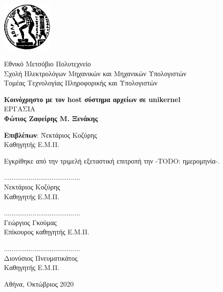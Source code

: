 \documentclass[12pt, a4paper, notitlepage]{report}
\newcommand{\en}[1]{\foreignlanguage{english}{#1}}
\newcommand{\blankpage}{\newpage\null\thispagestyle{empty}\newpage}
\newcommand{\host}{\en{host}}
\begin{document}
\blankpage

\vspace*{-8ex}
\noindent
\begin{minipage}{3.0cm}
	\includegraphics[height=2.5cm]{pyrforos}
\end{minipage}
\begin{minipage}{12.0cm}
	Εθνικό Μετσόβιο Πολυτεχνείο \\[3pt]
	Σχολή Ηλεκτρολόγων Μηχανικών και Μηχανικών Υπολογιστών \\[3pt]
	Τομέας Τεχνολογίας Πληροφορικής και Υπολογιστών
\end{minipage}
\vspace{14ex}
\begin{center}
	\large\textbf{Κοινόχρηστο με τον \host{} σύστημα αρχείων σε \en{unikernel}} \\
	\vspace{14ex}
	 ΕΡΓΑΣΙΑ \\
	\vspace{1ex}
	\center\textbf{Φώτιος Ζαφείρης Μ. Ξενάκης}
\end{center}
\vfill
\begin{tabbing}
	\normalsize
	\textbf{Επιβλέπων}: \= Νεκτάριος Κοζύρης \\
						\> Καθηγητής Ε.Μ.Π.
\end{tabbing}
\vspace{4ex}
Εγκρίθηκε από την τριμελή εξεταστική επιτροπή την -TODO: ημερομηνία-.
\vspace{4ex}
\begin{center}
	\scriptsize
	\parbox[b]{0.3\textwidth} {
		\center
		........................................ \\
		Νεκτάριος Κοζύρης \\
		Καθηγητής Ε.Μ.Π.
	}
	\parbox[b]{0.3\textwidth} {
		\center
		........................................ \\
		Γεώργιος Γκούμας \\
		Επίκουρος καθηγητής Ε.Μ.Π.
	}
	\parbox[b]{0.3\textwidth} {
		\center
		........................................ \\
		Διονύσιος Πνευματικάτος \\
		Καθηγητής Ε.Μ.Π.
	}
\end{center}
\vspace{2ex}
\begin{center}
	\normalsize
	Αθήνα, Οκτώβριος 2020
\end{center}
\thispagestyle{empty}
\end{document}
